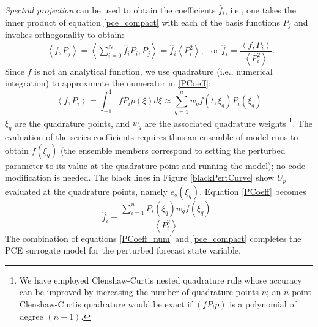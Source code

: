 			\emph{Spectral projection} can be used to obtain the coefficients $\hat{f}_{i}$, i.e.,
			one takes the inner product of equation \eqref{pce_compact} with each of the basis functions
			$P_j$ and invokes orthogonality to obtain: 
			\begin{equation} \label{PCoeff}
				\begin{aligned}
					\left< f, P_j \right>
						= \left<  \sum\limits_{i=0}^{N}
							\hat{f}_i P_i, P_j \right>
						= \hat{f}_i \left< P_i^2 \right>,
				\end{aligned}
			\mbox{ or }
				\hat{f}_i = \frac{\left< f, P_i \right>}
					{\left< P_i^2 \right>}.
			\end{equation}
			Since $f$ is not an analytical function, we use quadrature 
			(i.e., numerical integration) to approximate the numerator in \eqref{PCoeff}:
			\begin{equation}	\label{1DQ}
				\left< f, P_i \right> = \int_{-1}^1 f P_i p(\xi) d\xi \approx 
				\sum\limits_{q = 1}^{n} w_q f(t,\xi_q) P_i(\xi_q)
			\end{equation}
			$\xi_q$ are the quadrature points,
			and $w_q$ are the associated quadrature weights
			\footnote{ We have employed 
			Clenshaw-Curtis nested quadrature rule {\citep{Clenshaw60}} whose accuracy can be
			improved by increasing the number of quadrature points $n$; an $n$ point Clenshaw-Curtis quadrature would be
			exact if $(fP_ip)$ is a polynomial of degree $(n-1)$. }.
                        The evaluation of the series coefficients requires thus an ensemble of model runs to obtain
			$f(\xi_q)$ (the ensemble members correspond to setting the perturbed parameter to its value at the quadrature
			point and running the model); no code modification is needed.
			The black lines in Figure {\ref{blackPertCurve}} show 
			$U_p$ evaluated at the quadrature points, namely $e_s(\xi_q)$. 
			Equation \eqref{PCoeff} becomes
			\begin{equation} \label{PCoeff_num}
				\hat{f}_i = \frac{\sum_{i=1}^n  P_i(\xi_q) w_q f(\xi_q)}
					{\left< P_i^2 \right>}.\
			\end{equation}		
			The combination of equations \eqref{PCoeff_num} and \eqref{pce_compact}
			completes the PCE surrogate model for the perturbed forecast state variable.\
			

